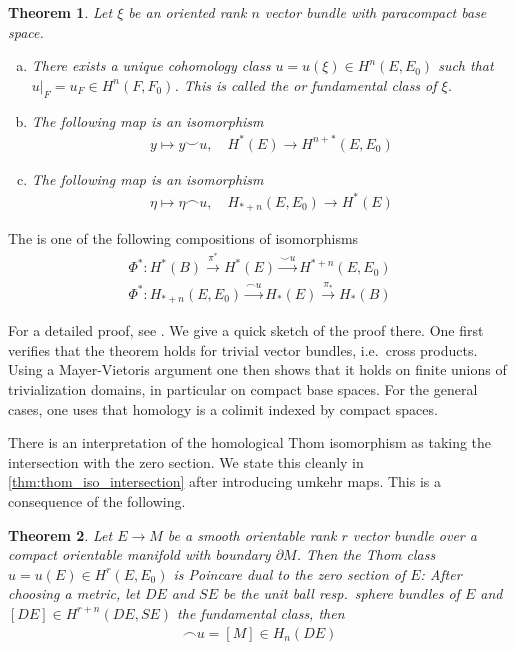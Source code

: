 \documentclass{scrartcl}
\let\emph\relax
\theoremstyle{plain}
\newtheorem{theorem}{Theorem}[section]
\theoremstyle{definition}
\newcommand{\capp}{\mathbin{\frown}}
\newcommand{\cupp}{\mathbin{\smile}}
\begin{document}
\begin{theorem}
    Let $\xi$ be an oriented rank $n$ vector bundle with paracompact base space.
    \begin{enumerate}[(a)]
        \item There exists a unique cohomology class $u=u(\xi)\in H^n(E, E_0)$ such that $u|_F = u_F\in H^n(F, F_0)$. This is called the \emph{Thom class} or fundamental class of $\xi$.
        \item The following map is an isomorphism
        \begin{align*}
            y \mapsto y\cupp u, \quad H^*(E) \to H^{n+*}(E, E_0)    
        \end{align*}
        \item The following map is an isomorphism
        \begin{align*}
            \eta \mapsto \eta\capp u, \quad H_{*+n}(E, E_0) \to H^{*}(E)
        \end{align*}
    \end{enumerate}
\end{theorem}

The \emph{Thom isomorphism} is one of the following compositions of isomorphisms
\begin{align*}
    \Phi^*\colon H^*(B)\xrightarrow{\pi^*}H^*(E)\xrightarrow{\cupp u}H^{*+n}(E, E_0) \\
    \Phi^*\colon H_{*+n}(E, E_0) \xrightarrow{\capp u} H_*(E)\xrightarrow{\pi_*}H_*(B)
\end{align*}

For a detailed proof, see \cite{milnor1974characteristic}. We give a quick sketch of the proof there. One first verifies that the theorem holds for trivial vector bundles, i.e.\ cross products. Using a Mayer-Vietoris argument one then shows that it holds on finite unions of trivialization domains, in particular on compact base spaces. For the general cases, one uses that homology is a colimit indexed by compact spaces.

There is an interpretation of the homological Thom isomorphism as taking the intersection with the zero section. We state this cleanly in \ref{thm:thom_iso_intersection} after introducing umkehr maps. This is a consequence of the following. 

\begin{theorem}\label{thm:thom_class_dual}
    Let $E\to M$ be a smooth orientable rank $r$ vector bundle over a compact orientable manifold with boundary $\partial M$. Then the Thom class $u=u(E)\in H^r(E, E_0)$ is Poincare dual to the zero section of $E$: After choosing a metric, let $DE$ and $SE$ be the unit ball resp.\ sphere bundles of $E$ and $[DE]\in H^{r+n}(DE, SE)$ the fundamental class, then
    \begin{align*}
        [DE] \capp u = [M]\in H_n(DE)
    \end{align*}
\end{theorem}
\end{document}
